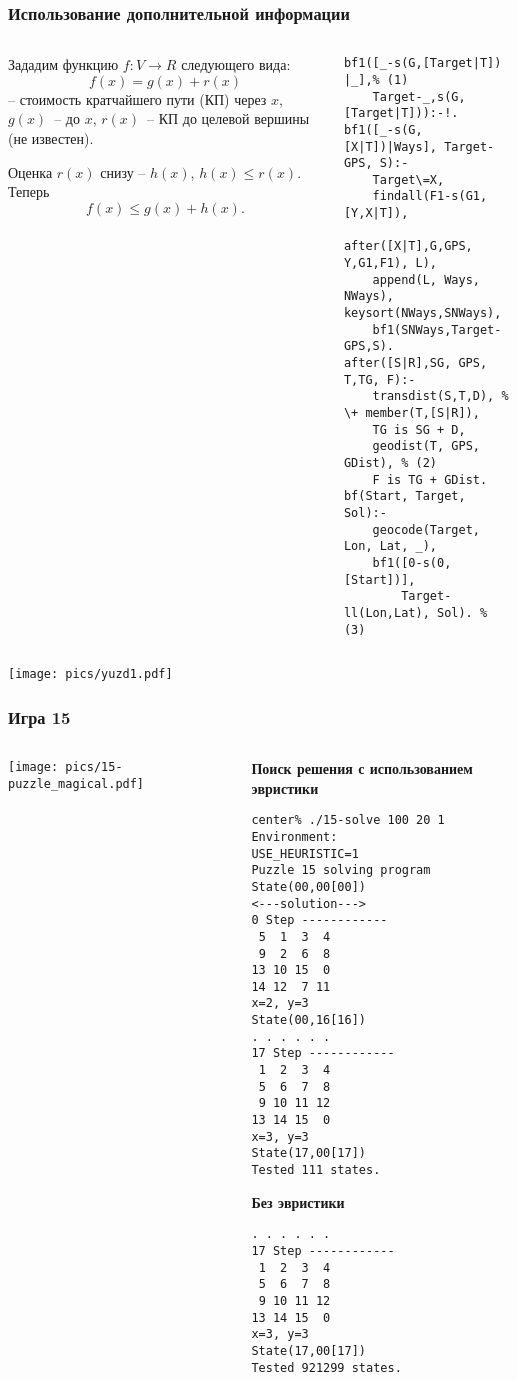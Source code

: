 \documentclass[10pt]{beamer}
\begin{document}
\begin{frame}[fragile]
  \frametitle{Использование дополнительной информации}
  \begin{columns}
    \begin{column}{0.5\textwidth}\footnotesize
      Зададим функцию $f\!\!:V\to R$ следующего вида:
\begin{equation*}
  f(x)=g(x)+r(x)
\end{equation*}
-- стоимость кратчайшего пути (КП) через $x$,  $g(x)$~-- до $x$, $r(x)$~-- КП до целевой вершины (не известен).

Оценка $r(x)$ снизу -- $h(x)$, $h(x)\leqslant r(x)$.  Теперь
\begin{equation*}
  f(x)\leqslant g(x)+h(x).
\end{equation*}
    \end{column}
    \begin{column}{0.5\textwidth}
\begin{verbatim}
bf1([_-s(G,[Target|T]) |_],% (1)
    Target-_,s(G,[Target|T])):-!.
bf1([_-s(G,[X|T])|Ways], Target-GPS, S):-
    Target\=X,
    findall(F1-s(G1,[Y,X|T]),
      after([X|T],G,GPS, Y,G1,F1), L),
    append(L, Ways, NWays), keysort(NWays,SNWays),
    bf1(SNWays,Target-GPS,S).
after([S|R],SG, GPS, T,TG, F):-
    transdist(S,T,D), % \+ member(T,[S|R]),
    TG is SG + D,
    geodist(T, GPS, GDist), % (2)
    F is TG + GDist.
bf(Start, Target, Sol):-
    geocode(Target, Lon, Lat, _),
    bf1([0-s(0,[Start])],
        Target-ll(Lon,Lat), Sol). % (3)
\end{verbatim}
    \end{column}
  \end{columns}
  \begin{center}
    \texttt{[image: pics/yuzd1.pdf]}
  \end{center}
\end{frame}

\begin{frame}[fragile]
  \frametitle{Игра 15}
  \begin{columns}
    \begin{column}{0.5\textwidth}
      \texttt{[image: pics/15-puzzle\_magical.pdf]}
    \end{column}
    \begin{column}{0.5\textwidth}
\textbf{Поиск решения с использованием эвристики}
\begin{verbatim}
center% ./15-solve 100 20 1
Environment:
USE_HEURISTIC=1
Puzzle 15 solving program
State(00,00[00])
<---solution--->
0 Step ------------
 5  1  3  4
 9  2  6  8
13 10 15  0
14 12  7 11
x=2, y=3
State(00,16[16])
. . . . . .
17 Step ------------
 1  2  3  4
 5  6  7  8
 9 10 11 12
13 14 15  0
x=3, y=3
State(17,00[17])
Tested 111 states.
\end{verbatim}
\textbf{Без эвристики}
\begin{verbatim}
. . . . . .
17 Step ------------
 1  2  3  4
 5  6  7  8
 9 10 11 12
13 14 15  0
x=3, y=3
State(17,00[17])
Tested 921299 states.
\end{verbatim}
    \end{column}
  \end{columns}
\end{frame}
\end{document}
